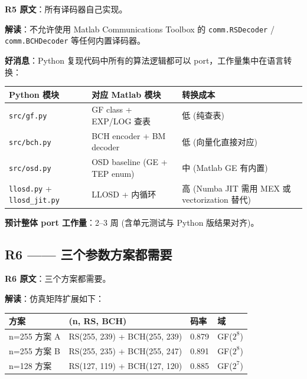 \documentclass[11pt,a4paper]{article}
\begin{document}
\begin{quotebox}
\textbf{R5 原文}：所有译码器自己实现。
\end{quotebox}

\textbf{解读}：不允许使用 Matlab Communications Toolbox 的
\texttt{comm.RSDecoder} / \texttt{comm.BCHDecoder} 等任何内置译码器。

\textbf{好消息}：Python 复现代码中所有的算法逻辑都可以 port，工作量集中在语言转换：

\begin{table}[!ht]
\centering
\begin{tabularx}{\textwidth}{lXX}
\toprule
Python 模块 & 对应 Matlab 模块 & 转换成本 \\
\midrule
\texttt{src/gf.py} & GF class + EXP/LOG 查表 & 低 (纯查表) \\
\texttt{src/bch.py} & BCH encoder + BM decoder & 低 (向量化直接对应) \\
\texttt{src/osd.py} & OSD baseline (GE + TEP enum) & 中 (Matlab GE 有内置) \\
\texttt{llosd.py} + \texttt{llosd\_jit.py} & LLOSD + 内循环 & 高 (Numba JIT 需用 MEX 或 vectorization 替代) \\
\bottomrule
\end{tabularx}
\end{table}

\textbf{预计整体 port 工作量}：2--3 周 (含单元测试与 Python 版结果对齐)。

\subsection{R6 —— 三个参数方案都需要}

\begin{quotebox}
\textbf{R6 原文}：三个方案都需要。
\end{quotebox}

\textbf{解读}：仿真矩阵扩展如下：

\begin{table}[!ht]
\centering
\begin{tabularx}{\textwidth}{lXll}
\toprule
方案 & (n, RS, BCH) & 码率 & 域 \\
\midrule
n=255 方案 A & RS(255, 239) + BCH(255, 239) & 0.879 & GF($2^8$) \\
n=255 方案 B & RS(255, 235) + BCH(255, 247) & 0.891 & GF($2^8$) \\
n=128 方案   & RS(127, 119) + BCH(127, 120) & 0.885 & GF($2^7$) \\
\bottomrule
\end{tabularx}
\end{table}
\end{document}
